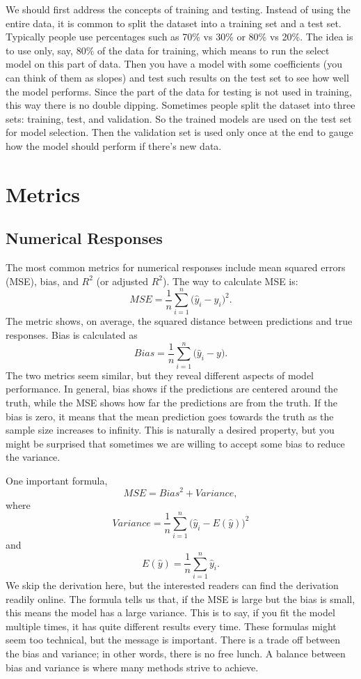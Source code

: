 \documentclass[
]{book}
\begin{document}
We should first address the concepts of training and testing. Instead of using the entire data, it is common to split the dataset into a training set and a test set. Typically people use percentages such as 70\% vs 30\% or 80\% vs 20\%. The idea is to use only, say, 80\% of the data for training, which means to run the select model on this part of data. Then you have a model with some coefficients (you can think of them as slopes) and test such results on the test set to see how well the model performs. Since the part of the data for testing is not used in training, this way there is no double dipping. Sometimes people split the dataset into three sets: training, test, and validation. So the trained models are used on the test set for model selection. Then the validation set is used only once at the end to gauge how the model should perform if there's new data.

\hypertarget{metrics}{%
\section{Metrics}\label{metrics}}

\hypertarget{numerical-responses}{%
\subsection{Numerical Responses}\label{numerical-responses}}

The most common metrics for numerical responses include mean squared errors (MSE), bias, and \(R^2\) (or adjusted \(R^2\)). The way to calculate MSE is:
\[MSE = \frac{1}{n} \sum_{i=1}^n \bigg( \hat{y}_i - y_i \bigg)^2.\]
The metric shows, on average, the squared distance between predictions and true responses. Bias is calculated as
\[Bias = \frac{1}{n} \sum_{i=1}^n \bigg( \hat{y}_i - y \bigg).\]
The two metrics seem similar, but they reveal different aspects of model performance. In general, bias shows if the predictions are centered around the truth, while the MSE shows how far the predictions are from the truth. If the bias is zero, it means that the mean prediction goes towards the truth as the sample size increases to infinity. This is naturally a desired property, but you might be surprised that sometimes we are willing to accept some bias to reduce the variance.

One important formula,
\[MSE = Bias^2 + Variance,\]
where
\[Variance = \frac{1}{n} \sum_{i=1}^n \bigg( \hat{y}_i - E(\hat{y}) \bigg)^2\]
and
\[E(\hat{y}) = \frac{1}{n} \sum_{i=1}^n \hat{y}_i.\]
We skip the derivation here, but the interested readers can find the derivation readily online. The formula tells us that, if the MSE is large but the bias is small, this means the model has a large variance. This is to say, if you fit the model multiple times, it has quite different results every time. These formulas might seem too technical, but the message is important. There is a trade off between the bias and variance; in other words, there is no free lunch. A balance between bias and variance is where many methods strive to achieve.
\end{document}
